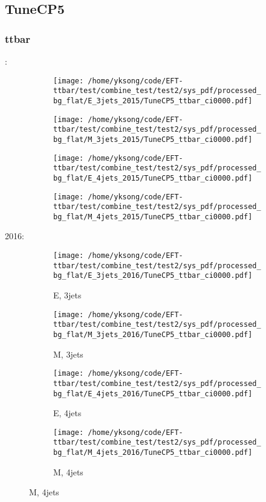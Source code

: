 \documentclass{beamer}
\begin{document}
\subsection{TuneCP5}

\begin{frame}
\frametitle{ttbar}
\fontsize{5}{1}:
\begin{figure}
\centering
\begin{subfigure}[b]{0.24\textwidth}
\texttt{[image: /home/yksong/code/EFT-ttbar/test/combine\_test/test2/sys\_pdf/processed\_bg\_flat/E\_3jets\_2015/TuneCP5\_ttbar\_ci0000.pdf]}
\end{subfigure}
\begin{subfigure}[b]{0.24\textwidth}
\texttt{[image: /home/yksong/code/EFT-ttbar/test/combine\_test/test2/sys\_pdf/processed\_bg\_flat/M\_3jets\_2015/TuneCP5\_ttbar\_ci0000.pdf]}
\end{subfigure}
\begin{subfigure}[b]{0.24\textwidth}
\texttt{[image: /home/yksong/code/EFT-ttbar/test/combine\_test/test2/sys\_pdf/processed\_bg\_flat/E\_4jets\_2015/TuneCP5\_ttbar\_ci0000.pdf]}
\end{subfigure}
\begin{subfigure}[b]{0.24\textwidth}
\texttt{[image: /home/yksong/code/EFT-ttbar/test/combine\_test/test2/sys\_pdf/processed\_bg\_flat/M\_4jets\_2015/TuneCP5\_ttbar\_ci0000.pdf]}
\end{subfigure}
\end{figure}
2016:
\begin{figure}
\centering
\begin{subfigure}[b]{0.24\textwidth}
\texttt{[image: /home/yksong/code/EFT-ttbar/test/combine\_test/test2/sys\_pdf/processed\_bg\_flat/E\_3jets\_2016/TuneCP5\_ttbar\_ci0000.pdf]}
\captionsetup{font=tiny}
\caption{E, 3jets}
\end{subfigure}
\begin{subfigure}[b]{0.24\textwidth}
\texttt{[image: /home/yksong/code/EFT-ttbar/test/combine\_test/test2/sys\_pdf/processed\_bg\_flat/M\_3jets\_2016/TuneCP5\_ttbar\_ci0000.pdf]}
\captionsetup{font=tiny}
\caption{M, 3jets}
\end{subfigure}
\begin{subfigure}[b]{0.24\textwidth}
\texttt{[image: /home/yksong/code/EFT-ttbar/test/combine\_test/test2/sys\_pdf/processed\_bg\_flat/E\_4jets\_2016/TuneCP5\_ttbar\_ci0000.pdf]}
\captionsetup{font=tiny}
\caption{E, 4jets}
\end{subfigure}
\begin{subfigure}[b]{0.24\textwidth}
\texttt{[image: /home/yksong/code/EFT-ttbar/test/combine\_test/test2/sys\_pdf/processed\_bg\_flat/M\_4jets\_2016/TuneCP5\_ttbar\_ci0000.pdf]}
\captionsetup{font=tiny}
\caption{M, 4jets}
\end{subfigure}
\end{figure}
\end{frame}
\end{document}

